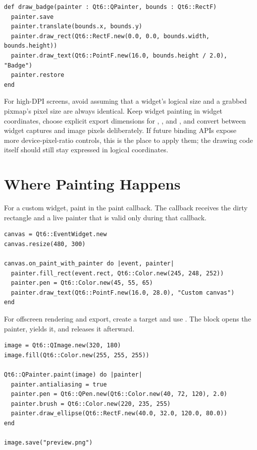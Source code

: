 \begin{lstlisting}[style=crystal]
def draw_badge(painter : Qt6::QPainter, bounds : Qt6::RectF)
  painter.save
  painter.translate(bounds.x, bounds.y)
  painter.draw_rect(Qt6::RectF.new(0.0, 0.0, bounds.width, bounds.height))
  painter.draw_text(Qt6::PointF.new(16.0, bounds.height / 2.0), "Badge")
  painter.restore
end
\end{lstlisting}

For high-DPI screens, avoid assuming that a widget's logical size and a grabbed pixmap's pixel size are always identical. Keep widget painting in widget coordinates, choose explicit export dimensions for , , and , and convert between widget captures and image pixels deliberately. If future binding APIs expose more device-pixel-ratio controls, this is the place to apply them; the drawing code itself should still stay expressed in logical coordinates.

\section{Where Painting Happens}

For a custom widget, paint in the  paint callback. The callback receives the dirty rectangle and a live painter that is valid only during that callback.

\begin{lstlisting}[style=crystal]
canvas = Qt6::EventWidget.new
canvas.resize(480, 300)

canvas.on_paint_with_painter do |event, painter|
  painter.fill_rect(event.rect, Qt6::Color.new(245, 248, 252))
  painter.pen = Qt6::Color.new(45, 55, 65)
  painter.draw_text(Qt6::PointF.new(16.0, 28.0), "Custom canvas")
end
\end{lstlisting}

For offscreen rendering and export, create a target and use . The block opens the painter, yields it, and releases it afterward.

\begin{lstlisting}[style=crystal]
image = Qt6::QImage.new(320, 180)
image.fill(Qt6::Color.new(255, 255, 255))

Qt6::QPainter.paint(image) do |painter|
  painter.antialiasing = true
  painter.pen = Qt6::QPen.new(Qt6::Color.new(40, 72, 120), 2.0)
  painter.brush = Qt6::Color.new(220, 235, 255)
  painter.draw_ellipse(Qt6::RectF.new(40.0, 32.0, 120.0, 80.0))
end

image.save("preview.png")
\end{lstlisting}

